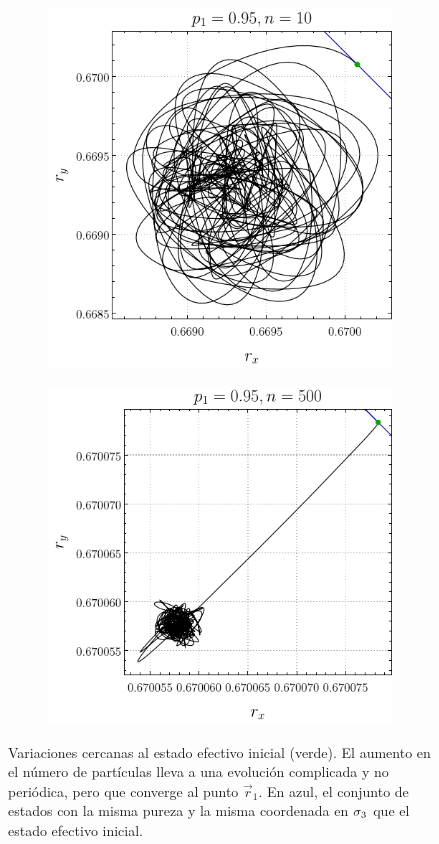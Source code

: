 \begin{figure}[ht!]
    \centering
    \begin{subfigure}{0.5\textwidth}
      \centering
      \includegraphics[width=0.9\linewidth]{chapter3/figures_separable/local_prefinv_ran_n=10_p=0.95_r=0.95_a=-3_b=3.png}
    \end{subfigure}%
    \begin{subfigure}{0.5\textwidth}
      \centering
      \includegraphics[width=0.9\linewidth]{chapter3/figures_separable/local_prefinv_ran_n=500_p=0.95_r=0.95_a=-3_b=3.png}
    \end{subfigure}
    \caption{Variaciones cercanas al estado efectivo inicial (verde). El aumento en el número de partículas lleva a una evolución complicada y no periódica, pero que converge al punto $\vec{r}_{1}$. En azul, el conjunto de estados con la misma pureza y la misma coordenada en $\sigma_{3}$ que el estado efectivo inicial.}\label{fig:PrefInv1}
\end{figure}

